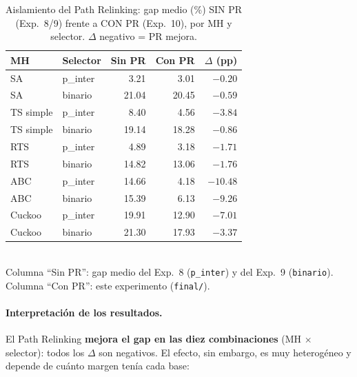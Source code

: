 \begin{table}[h]
\centering
\caption{Aislamiento del Path Relinking: gap medio (\%) SIN PR (Exp.~8/9)
         frente a CON PR (Exp.~10), por MH y selector. $\Delta$ negativo = PR
         mejora.}
\label{tab:pr-aislado-delta}
\small
\begin{tabular}{llrrr}
\toprule
MH & Selector & Sin PR & Con PR & $\Delta$ (pp) \\
\midrule
SA        & p\_inter & 3.21  & 3.01  & $-0.20$ \\
SA        & binario  & 21.04 & 20.45 & $-0.59$ \\
TS simple & p\_inter & 8.40  & 4.56  & $-3.84$ \\
TS simple & binario  & 19.14 & 18.28 & $-0.86$ \\
RTS       & p\_inter & 4.89  & 3.18  & $-1.71$ \\
RTS       & binario  & 14.82 & 13.06 & $-1.76$ \\
ABC       & p\_inter & 14.66 & 4.18  & $\mathbf{-10.48}$ \\
ABC       & binario  & 15.39 & 6.13  & $\mathbf{-9.26}$ \\
Cuckoo    & p\_inter & 19.91 & 12.90 & $\mathbf{-7.01}$ \\
Cuckoo    & binario  & 21.30 & 17.93 & $\mathbf{-3.37}$ \\
\bottomrule
\end{tabular}
\\[4pt]
\footnotesize
Columna ``Sin PR'': gap medio del Exp.~8 (\texttt{p\_inter}) y del Exp.~9
(\texttt{binario}). Columna ``Con PR'': este experimento (\texttt{final/}).
\end{table}

\paragraph{Interpretación de los resultados.}
El Path Relinking \textbf{mejora el gap en las diez combinaciones}
(MH $\times$ selector): todos los $\Delta$ son negativos. El efecto, sin
embargo, es muy heterogéneo y depende de cuánto margen tenía cada base:

